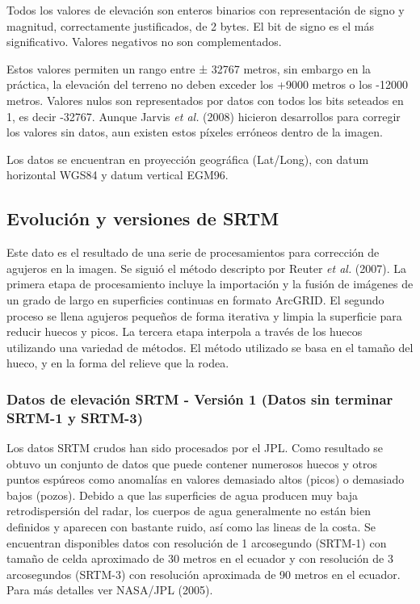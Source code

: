 \documentclass[10pt,a4paper, twoside]{report}
\begin{document}
Todos los valores de elevación son enteros binarios con representación de signo y magnitud, correctamente justificados, de 2 bytes. El bit de signo es el más significativo. Valores negativos no son complementados.

Estos valores permiten un rango entre ± 32767 metros, sin embargo en la práctica, la elevación del terreno no deben exceder los +9000 metros o los -12000 metros. Valores nulos son representados por datos con todos los bits seteados en 1, es decir -32767.
Aunque Jarvis \textit{et al.} (2008) hicieron desarrollos para corregir los valores sin datos, aun existen estos píxeles erróneos dentro de la imagen.

Los datos se encuentran en proyección geográfica (Lat/Long), con datum horizontal WGS84 y datum vertical EGM96.

\subsection{Evolución y versiones de SRTM}

Este dato es el resultado de una serie de procesamientos para corrección de agujeros en la imagen. Se siguió el método descripto por Reuter \textit{et al.} (2007). La primera etapa de procesamiento incluye la importación y la fusión de imágenes de un grado de largo en superficies continuas en formato ArcGRID. El segundo proceso se llena agujeros pequeños de forma iterativa y limpia la superficie para reducir huecos y picos. La tercera etapa interpola a través de los huecos utilizando una variedad de métodos. El método utilizado se basa en el tamaño del hueco, y en la forma del relieve que la rodea.

\subsubsection{Datos de elevación SRTM - Versión 1 (Datos sin terminar SRTM-1 y SRTM-3)}

Los datos SRTM crudos han sido procesados por el JPL. Como resultado se obtuvo un conjunto de datos que puede contener numerosos huecos y otros puntos espúreos como anomalías en valores demasiado altos (picos) o demasiado bajos (pozos). Debido a que las superficies de agua producen muy baja retrodispersión del radar, los cuerpos de agua generalmente no están bien definidos y aparecen con bastante ruido, así como las lineas de la costa. Se encuentran disponibles datos con resolución de 1 arcosegundo (SRTM-1) con tamaño de celda aproximado de 30 metros en el ecuador y con resolución de 3 arcosegundos (SRTM-3) con resolución aproximada de 90 metros en el ecuador. Para más detalles ver NASA/JPL (2005).
\end{document}
